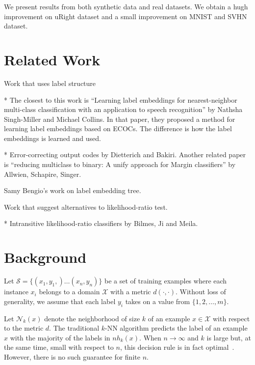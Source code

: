 \documentclass{article}
\begin{document}
We present results from both synthetic data and real datasets. We
obtain a hugh improvement on uRight dataset and a small improvement on
MNIST and SVHN dataset.

\section{Related Work}
\label{sec:related}

Work that uses label structure

* The closest to this work is ``Learning label embeddings for
nearest-neighbor multi-class classification with an application to
speech recognition'' by Nathsha Singh-Miller and Michael Collins. In
that paper, they proposed a method for learning label embeddings based
on ECOCs. The difference is how the label embeddings is learned and
used.

* Error-correcting output codes by Dietterich and Bakiri. Another
related paper is ``reducing multiclass to binary: A unify approach for
Margin classifiers'' by Allwien, Schapire, Singer.

Samy Bengio's work on label embedding tree.

Work that suggest alternatives to likelihood-ratio test.

* Intransitive likelihood-ratio classifiers by Bilmes, Ji and Meila.


\section{Background}

\newcommand{\X}{\mathcal{X}}
\newcommand{\Y}{\mathcal{Y}}
\newcommand{\D}{\mathcal{D}}
\newcommand{\S}{\mathcal{S}}
\newcommand{\nh}{\mathcal{N}}

Let $\S = \{ (x_1,y_1,) \ldots (x_n,y_n)\}$ be a set of training
examples where each instance $x_i$ belongs to a domain $\X$ with a
metric $d(\cdot,\cdot)$. Without loss of generality, we assume that
each label $y_i$ takes on a value from $\{1,2,\ldots,m\}$. 

Let $\nh_k(x)$ denote the neighborhood of size $k$ of an example $x
\in \X$ with respect to the metric $d$. The traditional $k$-NN
algorithm predicts the label of an example $x$ with the majority of
the labels in $nh_k(x)$. When $n \rightarrow \infty$ and $k$ is large
but, at the same time, small with respect to $n$, this decision rule is
in fact optimal~\cite{Fix and Hodges}. However, there is no such
guarantee for finite $n$.
\end{document}
